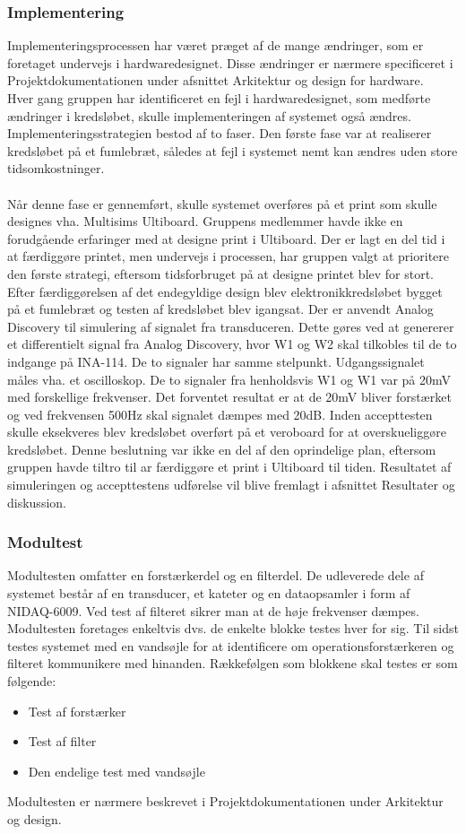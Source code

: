 \subsubsection{Implementering}
Implementeringsprocessen har været præget af de mange ændringer, som er foretaget undervejs i hardwaredesignet. Disse ændringer er nærmere specificeret i Projektdokumentationen under afsnittet Arkitektur og design for hardware. \\
Hver gang gruppen har identificeret en fejl i hardwaredesignet, som medførte ændringer i kredsløbet, skulle implementeringen af systemet også ændres. Implementeringsstrategien bestod af to faser. Den første fase var at realiserer kredsløbet på et fumlebræt, således at fejl i systemet nemt kan ændres uden store tidsomkostninger. \\\\
Når denne fase er gennemført, skulle systemet overføres på et print som skulle designes vha. Multisims Ultiboard. Gruppens medlemmer havde ikke en forudgående erfaringer med at designe print i Ultiboard. Der er lagt en del tid i at færdiggøre printet, men undervejs i processen, har gruppen valgt at prioritere den første strategi, eftersom tidsforbruget på at designe printet blev for stort. \\
Efter færdiggørelsen af det endegyldige design blev elektronikkredsløbet bygget på et fumlebræt og testen af kredsløbet blev igangsat. Der er anvendt Analog Discovery til simulering af signalet fra transduceren. Dette gøres ved at genererer et differentielt signal fra Analog Discovery, hvor W1 og W2 skal tilkobles til de to indgange på INA-114. De to signaler har samme stelpunkt. Udgangssignalet måles vha. et oscilloskop. De to signaler fra henholdsvis W1 og W1 var på 20mV med forskellige frekvenser. Det forventet resultat er at de 20mV bliver forstærket og ved frekvensen 500Hz skal signalet dæmpes med 20dB. Inden accepttesten skulle eksekveres blev kredsløbet overført på et veroboard for at overskueliggøre kredsløbet. Denne beslutning var ikke en del af den oprindelige plan, eftersom gruppen havde tiltro til ar færdiggøre et print i Ultiboard til tiden. Resultatet af simuleringen og accepttestens udførelse vil blive fremlagt i afsnittet Resultater og diskussion. 
\subsubsection{Modultest}
Modultesten omfatter en forstærkerdel og en filterdel. De udleverede dele af systemet består af en transducer, et kateter og en dataopsamler i form af NIDAQ-6009. Ved test af filteret sikrer man at de høje frekvenser dæmpes. Modultesten foretages enkeltvis dvs. de enkelte blokke testes hver for sig. Til sidst testes systemet med en vandsøjle for at identificere om operationsforstærkeren og filteret kommunikere med hinanden.  Rækkefølgen som blokkene skal testes er som følgende:
\begin{itemize}
\item Test af forstærker
\item Test af filter
\item Den endelige test med vandsøjle
\end{itemize}
Modultesten er nærmere beskrevet i Projektdokumentationen under Arkitektur og design.
